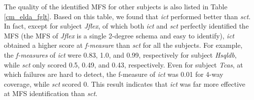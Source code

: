 \documentclass[journal,12pt,onecolumn,draftclsnofoot,]{IEEEtran}
\begin{document}
%



The quality of the identified MFS for other subjects is also listed in Table \ref{cm_elda_fglt}. Based on this table, we found that \emph{ict} performed better than \emph{sct}. In fact, except for subject \emph{Jflex}, of which both \emph{ict} and \emph{sct} perfectly identified the MFS (the MFS of \emph{Jflex} is a single 2-degree schema and easy to identify), \emph{ict} obtained a higher score at \emph{f-measure} than \emph{sct} for all the subjects. For example, the  \emph{f-measures} of \emph{ict} were 0.83, 1.0, and 0.99, respectively for subject \emph{Hsqldb}, while \emph{sct} only scored 0.5, 0.49, and 0.43, respectively. Even for subject \emph{Tcas}, at which failures are hard to detect, the f-measure of \emph{ict} was 0.01 for 4-way coverage, while \emph{sct} scored 0. This result indicates that \emph{ict} was far more effective at MFS identification than \emph{sct}.






\end{document}

